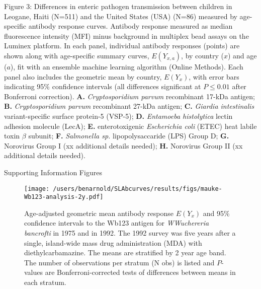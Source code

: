 \documentclass[11pt]{article}
\begin{document}
\clearpage
Figure 3: Differences in enteric pathogen transmission between children in Leogane, Haiti (N=511) and the United States (USA) (N=86) measured by age-specific antibody response curves. Antibody response measured as median fluorescence intensity (MFI) minus background in multiplex bead assays on the Luminex platform. In each panel, individual antibody responses (points) are shown along with age-specific summary curves, $E(Y_{x,a})$, by country ($x$) and age ($a$), fit with an ensemble machine learning algorithm (Online Methods). Each panel also includes the geometric mean by country, $E(Y_{x})$, with error bars indicating 95\% confidence intervals (all differences significant at $P\leq0.01$ after Bonferroni correction).
\textbf{A.} \textit{Cryptosporidium parvum} recombinant 17-kDa antigen;
\textbf{B.} \textit{Cryptosporidium parvum} recombinant 27-kDa antigen;
\textbf{C.} \textit{Giardia intestinalis} variant-specific surface protein-5 (VSP-5);
\textbf{D.} \textit{Entamoeba histolytica} lectin adhesion molecule (LecA);
\textbf{E.} enterotoxigenic \textit{Escherichia coli} (ETEC) heat labile toxin $\beta$ subunit;
\textbf{F.} \textit{Salmonella sp.} lipopolysaccaride (LPS) Group D;
\textbf{G.} Norovirus Group I (xx additional details needed);
\textbf{H.} Norovirus Group II (xx additional details needed).

\clearpage
\begin{center}
{\Large Supporting Information Figures}
\end{center}
\vspace{50pt}

\setcounter{figure}{0} 
\renewcommand{\thefigure}{S\arabic{figure}}



\begin{figure}[htbp]
\begin{center}
\texttt{[image: /users/benarnold/SLAbcurves/results/figs/mauke-Wb123-analysis-2y.pdf]}
\begin{minipage}{0.75\textwidth}
\caption{Age-adjusted geometric mean antibody response $E(Y_{x})$ and 95\% confidence intervals to the Wb123 antigen for \textit{WWuchereria bancrofti} in 1975 and in 1992. The 1992 survey was five years after a single, island-wide mass drug administration (MDA) with diethylcarbamazine. The means are stratified by 2 year age band. The number of observations per stratum (N obs) is listed and $P$-values are Bonferroni-corrected tests of differences between means in each stratum.}
\label{fig:maukeS1}
\end{minipage}
\end{center}
\end{figure}
\end{document}
